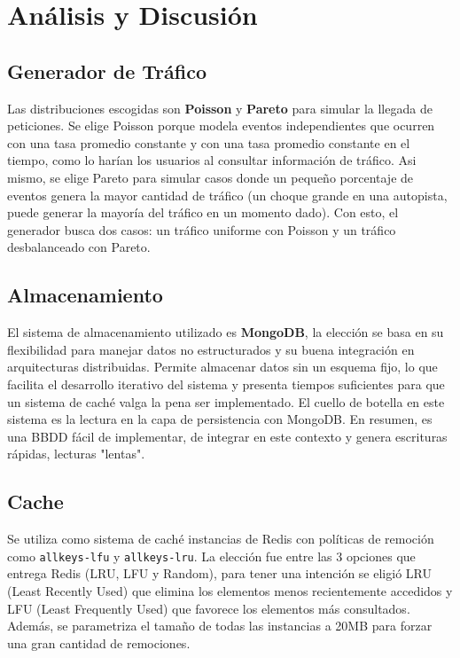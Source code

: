 \documentclass[12pt]{udpreport}
\begin{document}
\section{Análisis y Discusión}

\subsection{Generador de Tráfico}

Las distribuciones escogidas son \textbf{Poisson} y \textbf{Pareto} para simular la llegada de peticiones. Se elige Poisson porque modela eventos independientes que ocurren con una tasa promedio constante y con una tasa promedio constante en el tiempo, como lo harían los usuarios al consultar información de tráfico. Asi mismo, se elige Pareto para simular casos donde un pequeño porcentaje de eventos genera la mayor cantidad de tráfico (un choque grande en una autopista, puede generar la mayoría del tráfico en un momento dado). Con esto, el generador busca dos casos: un tráfico uniforme con Poisson y un tráfico desbalanceado con Pareto.

\subsection{Almacenamiento}
El sistema de almacenamiento utilizado es \textbf{MongoDB}, la elección se basa en su flexibilidad para manejar datos no estructurados y su buena integración en arquitecturas distribuidas. Permite almacenar datos sin un esquema fijo, lo que facilita el desarrollo iterativo del sistema y presenta tiempos suficientes para que un sistema de caché valga la pena ser implementado. El cuello de botella en este sistema es la lectura en la capa de persistencia con MongoDB. En resumen, es una BBDD fácil de implementar, de integrar en este contexto y genera escrituras rápidas, lecturas "lentas".

\subsection{Cache}
Se utiliza como sistema de caché instancias de Redis con políticas de remoción como \texttt{allkeys-lfu} y \texttt{allkeys-lru}. La elección fue entre las 3 opciones que entrega Redis (LRU, LFU y Random), para tener una intención se eligió LRU (Least Recently Used) que elimina los elementos menos recientemente accedidos y LFU (Least Frequently Used) que favorece los elementos más consultados. Además, se parametriza el tamaño de todas las instancias a 20MB para forzar una gran cantidad de remociones.
\end{document}
